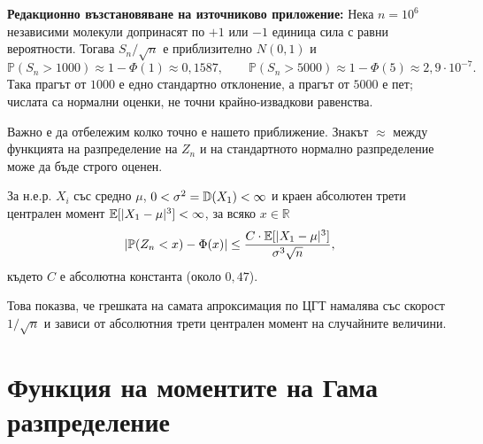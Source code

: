 \begin{supp}\label{supp:molecule-force}
\textbf{Редакционно възстановяване на източниково приложение:} Нека $n=10^6$
независими молекули допринасят по $+1$ или $-1$ единица сила с равни вероятности.
Тогава $S_n/\sqrt n$ е приблизително $N(0,1)$ и
\[ \mathbb{P}(S_n>1000)\approx 1-\Phi(1)\approx0{,}1587,\qquad
\mathbb{P}(S_n>5000)\approx 1-\Phi(5)\approx2{,}9\cdot10^{-7}. \]
Така прагът от $1000$ е едно стандартно отклонение, а прагът от $5000$ е пет;
числата са нормални оценки, не точни крайно-извадкови равенства.
\end{supp}

Важно е да отбележим колко точно е нашето приближение. Знакът $\approx$ между функцията на разпределение на $Z_n$ и на стандартното нормално разпределение може да бъде строго оценен.

\begin{thm}\label{thm:berry-esseen}
 За н.е.р. $X_i$ със средно $\mu$, $0<\sigma^2=\mathbb{D}(X_1)<\infty$ и краен
абсолютен трети централен момент $\mathbb{E}[|X_1-\mu|^3]<\infty$, за всяко $x \in \mathbb{R}$
\[ \left| \mathbb{P}(Z_n < x) - \Phi(x) \right| \le \frac{C \cdot \mathbb{E}[|X_1 - \mu|^3]}{\sigma^3 \sqrt{n}}, \]
където $C$ е абсолютна константа (около $0{,}47$).
\end{thm}
 Това показва, че грешката на самата апроксимация по ЦГТ намалява със скорост $1/\sqrt{n}$ и зависи от абсолютния трети централен момент на случайните величини.

\section{Функция на моментите на Гама разпределение}

